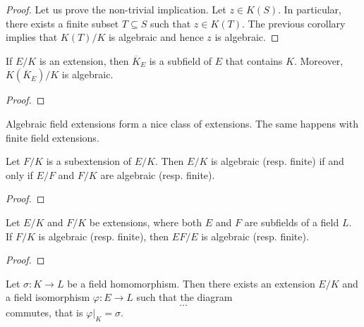 \begin{proof}
	Let us prove the non-trivial implication. Let $z\in K(S)$. In particular, 
	there exists a finite subset $T\subseteq S$ such that 
	$z\in K(T)$. The previous corollary implies that $K(T)/K$ is algebraic and
	hence $z$ is algebraic. 
\end{proof}

\begin{corollary}
	If $E/K$ is  an extension, then $\overline{K}_E$ 
	is a subfield of $E$ that contains $K$. Moreover, 
	$K(\overline{K}_E)/K$ is algebraic. 
\end{corollary}	

\begin{proof}
\end{proof}

\begin{corollary}
\end{corollary}


%
%
%
Algebraic field extensions form a nice class of extensions. The same happens
with finite field extensions. 

\begin{proposition}
	Let $F/K$ is a subextension of $E/K$. Then $E/K$ is algebraic (resp. finite)
	if and only if $E/F$ and $F/K$ are algebraic (resp. finite). 
\end{proposition}

\begin{proof}
\end{proof}

\begin{proposition}
	Let $E/K$ and $F/K$ be extensions, where both $E$ and $F$ are subfields of 
	a field $L$. If $F/K$ is algebraic (resp. finite), then $EF/E$ is algebraic (resp. finite).
\end{proposition}

\begin{proof}
\end{proof}

\begin{lemma}
	Let $\sigma\colon K\to L$ be a field homomorphism. Then there exists an extension
	$E/K$ and a field isomorphism $\varphi\colon E\to L$
	such that the diagram
	\[
	\dots	
	\]
	commutes, that is $\varphi|_K=\sigma$. 
\end{lemma}

